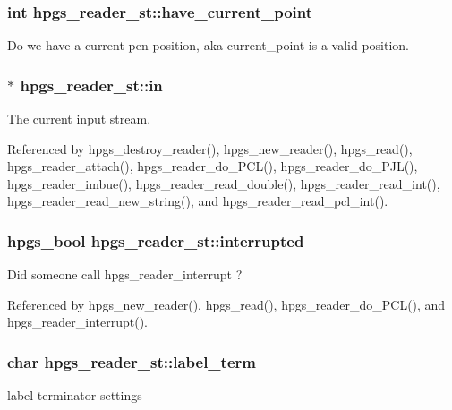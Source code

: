 \subsubsection[{have\_\-current\_\-point}]{\setlength{\rightskip}{0pt plus 5cm}int {\bf hpgs\_\-reader\_\-st::have\_\-current\_\-point}}\label{structhpgs__reader__st_ae622c0decb815832f931ab8f707c0b63}
Do we have a current pen position, aka current\_\-point is a valid position. 
\subsubsection[{in}]{$\ast$ {\bf hpgs\_\-reader\_\-st::in}}\label{structhpgs__reader__st_a0820ac4de3db8f395d3a09682560a82d}
The current input stream. 

Referenced by hpgs\_\-destroy\_\-reader(), hpgs\_\-new\_\-reader(), hpgs\_\-read(), hpgs\_\-reader\_\-attach(), hpgs\_\-reader\_\-do\_\-PCL(), hpgs\_\-reader\_\-do\_\-PJL(), hpgs\_\-reader\_\-imbue(), hpgs\_\-reader\_\-read\_\-double(), hpgs\_\-reader\_\-read\_\-int(), hpgs\_\-reader\_\-read\_\-new\_\-string(), and hpgs\_\-reader\_\-read\_\-pcl\_\-int().

\subsubsection[{interrupted}]{\setlength{\rightskip}{0pt plus 5cm}hpgs\_\-bool {\bf hpgs\_\-reader\_\-st::interrupted}}\label{structhpgs__reader__st_ad3efd09b11ca226c560481cb1dc1e343}
Did someone call {\ttfamily hpgs\_\-reader\_\-interrupt} ? 

Referenced by hpgs\_\-new\_\-reader(), hpgs\_\-read(), hpgs\_\-reader\_\-do\_\-PCL(), and hpgs\_\-reader\_\-interrupt().

\subsubsection[{label\_\-term}]{\setlength{\rightskip}{0pt plus 5cm}char {\bf hpgs\_\-reader\_\-st::label\_\-term}}\label{structhpgs__reader__st_abdb2310ec5ab74dc408eff8e85bdb1e7}
label terminator settings 

